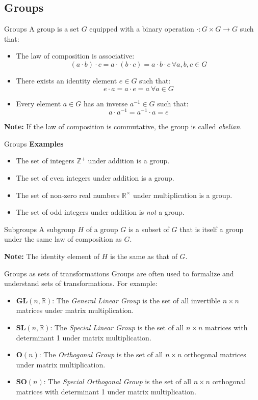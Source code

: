 \documentclass{beamer}
\begin{document}
\subsection{Groups}
\begin{frame}{Groups}
  A group is a set $G$ equipped with a binary operation $\cdot: G \times G \to G$ such that:
  \begin{itemize}
  \item The law of composition is associative: 
    \[ 
    (a \cdot b) \cdot c = a \cdot (b \cdot c) = a \cdot b \cdot c ~\forall a, b, c \in G
    \]
  \item There exists an identity element $e \in G$ such that:
    \[ 
    e \cdot a = a \cdot e = a ~\forall a \in G
    \]
  \item Every element $a \in G$ has an inverse $a^{-1} \in G$ such that:
    \[ 
    a \cdot a^{-1} = a^{-1} \cdot a = e
    \]
  \end{itemize}
  \textbf{Note:} If the law of composition is commutative, the group is called \textit{abelian}.
\end{frame}
\begin{frame}{Groups}
  \textbf{Examples}
  \begin{itemize}
  \item The set of integers $\mathbb{Z^+}$ under addition is a group.
  \item The set of even integers under addition is a group.
  \item The set of non-zero real numbers $\mathbb{R}^\times$ under multiplication is a group.
  \item The set of odd integers under addition is \textit{not} a group.
  \end{itemize}
\end{frame}
\begin{frame}{Subgroups}
  A subgroup $H$ of a group $G$ is a subset of $G$ that is itself a group under the same law of composition as $G$.

  \textbf{Note:} The identity element of $H$ is the same as that of $G$.
\end{frame}
\begin{frame}{Groups as sets of transformations}
  Groups are often used to formalize and understand sets of transformations. For example:
  \begin{itemize}
  \item $\mathbf{GL}(n, \mathbb{R})$: The \textit{General Linear Group} is the set of all invertible $n \times n$ matrices under matrix multiplication.
  \item $\mathbf{SL}(n, \mathbb{R})$: The \textit{Special Linear Group} is the set of all $n \times n$ matrices with determinant 1 under matrix multiplication.
  \item $\mathbf{O}(n)$: The \textit{Orthogonal Group} is the set of all $n \times n$ orthogonal matrices under matrix multiplication.
  \item $\mathbf{SO}(n)$: The \textit{Special Orthogonal Group} is the set of all $n \times n$ orthogonal matrices with determinant 1 under matrix multiplication.
  \end{itemize}
\end{frame}
\end{document}

